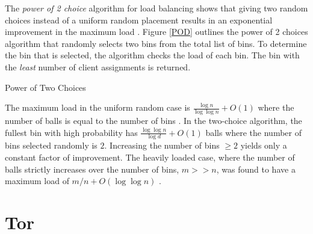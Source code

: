 The \emph{power of 2 choice} algorithm for load balancing shows that giving two random choices instead of a uniform random placement results in an exponential improvement in the maximum load \cite{mitzenmacher1996power}. Figure \ref{POD} outlines the power of 2 choices algorithm that randomly selects two bins from the total list of bins. To determine the bin that is selected, the algorithm checks the load of each bin. The bin with the \emph{least} number of client assignments is returned. 

\begin{algorithm}[t]
\DontPrintSemicolon
{}
\caption{Power of Two Choices \label{POD}}
\end{algorithm}

The maximum load in the uniform random case is $\frac{\log n}{\log \log n} + O(1)$ where the number of balls is equal to the number of bins \cite{azar1999balanced}. In the two-choice algorithm, the fullest bin with high probability has $ \frac{\log \log n}{\log d} + O(1)$ balls where the number of bins selected randomly is $2$. Increasing the number of bins $\geq 2$ yields only a constant factor of improvement. The heavily loaded case, where the number of balls strictly increases over the number of bins, $m >> n$, was found to have a maximum load of $m/n + O(\log{\log{n}})$ \cite{berenbrink2000balanced}. \\

\section{Tor} 

